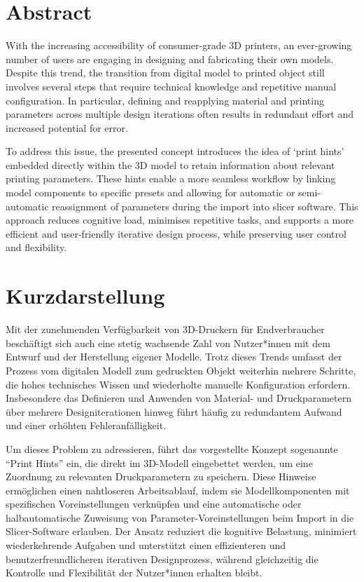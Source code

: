 \thispagestyle{empty}
\section*{Abstract}
\label{sec:abstract}

With the increasing accessibility of consumer-grade 3D printers, an ever-growing number of users are engaging in designing and fabricating their own models. 
Despite this trend, the transition from digital model to printed object still involves several steps that require technical knowledge and repetitive manual configuration. 
In particular, defining and reapplying material and printing parameters across multiple design iterations often results in redundant effort and increased potential for error.

To address this issue, the presented concept introduces the idea of `print hints' embedded directly within the 3D model to retain information about relevant printing parameters. 
These hints enable a more seamless workflow by linking model components to specific presets and allowing for automatic or semi-automatic reassignment of parameters during the import into slicer software. 
This approach reduces cognitive load, minimises repetitive tasks, and supports a more efficient and user-friendly iterative design process, while preserving user control and flexibility. 

\section*{Kurzdarstellung}
\label{sec:kurzdarstellung}

Mit der zunehmenden Verf\"ugbarkeit von 3D-Druckern f\"ur Endverbraucher besch\"aftigt sich auch eine stetig wachsende Zahl von Nutzer*innen mit dem Entwurf und der Herstellung eigener Modelle.
Trotz dieses Trends umfasst der Prozess vom digitalen Modell zum gedruckten Objekt weiterhin mehrere Schritte, die hohes technisches Wissen und wiederholte manuelle Konfiguration erfordern.
Insbesondere das Definieren und Anwenden von Material- und Druckparametern \"uber mehrere Designiterationen hinweg f\"uhrt h\"aufig zu redundantem Aufwand und einer erh\"ohten Fehleranf\"alligkeit.

Um dieses Problem zu adressieren, f\"uhrt das vorgestellte Konzept sogenannte ``Print Hints'' ein, die direkt im 3D-Modell eingebettet werden, um eine Zuordnung zu relevanten Druckparametern zu speichern.
Diese Hinweise erm\"oglichen einen nahtloseren Arbeitsablauf, indem sie Modellkomponenten mit spezifischen Voreinstellungen verkn\"upfen und eine automatische oder halbautomatische Zuweisung von Parameter-Voreinstellungen beim Import in die Slicer-Software erlauben.
Der Ansatz reduziert die kognitive Belastung, minimiert wiederkehrende Aufgaben und unterst\"utzt einen effizienteren und benutzerfreundlicheren iterativen Designprozess, w\"ahrend gleichzeitig die Kontrolle und Flexibilit\"at der Nutzer*innen erhalten bleibt.